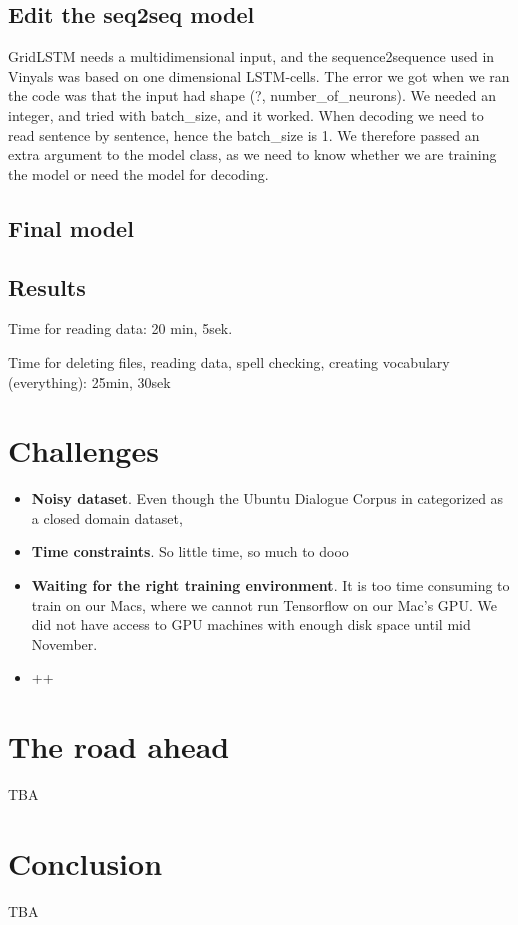 \documentclass{article} %
\begin{document}
\subsection{Edit the seq2seq model}
GridLSTM needs a multidimensional input, and the sequence2sequence used in Vinyals was based on one dimensional LSTM-cells. The error we got when we ran the code was that the input had shape (?, number\_of\_neurons). We needed an integer, and tried with batch\_size, and it worked. When decoding we need to read sentence by sentence, hence the batch\_size is 1. We therefore passed an extra argument to the model class, as we need to know whether we are training the model or need the model for decoding. 

\subsection{Final model}

\subsection{Results}

Time for reading data: 20 min, 5sek.

Time for deleting files, reading data, spell checking, creating vocabulary (everything): 25min, 30sek


\section{Challenges}
\begin{itemize}
    \item \textbf{Noisy dataset}. Even though the Ubuntu Dialogue Corpus in categorized as a closed domain dataset,
    \item \textbf{Time constraints}. So little time, so much to dooo
    \item \textbf{Waiting for the right training environment}. It is too time consuming to train on our Macs, where we cannot run Tensorflow on our Mac's GPU. We did not have access to GPU machines with enough disk space until mid November.
    \item ++
\end{itemize}

\section{The road ahead}
TBA

\section{Conclusion}
TBA
\end{document}
